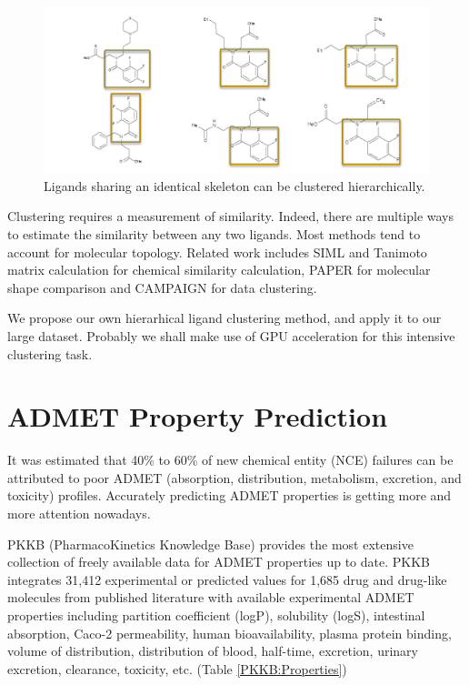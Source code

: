 \begin{figure}
\centering
\includegraphics[width=\textwidth]{istar/LigandClustering.png}
\caption{Ligands sharing an identical skeleton can be clustered hierarchically.}
\label{istar:LigandClustering}
\end{figure}

Clustering requires a measurement of similarity. Indeed, there are multiple ways to estimate the similarity between any two ligands. Most methods tend to account for molecular topology. Related work includes SIML \citep{726} and Tanimoto matrix calculation \citep{881} for chemical similarity calculation, PAPER \citep{491} for molecular shape comparison and CAMPAIGN \citep{932} for data clustering.

We propose our own hierarhical ligand clustering method, and apply it to our large dataset. Probably we shall make use of GPU acceleration for this intensive clustering task.

\section{ADMET Property Prediction}

It was estimated that 40\% to 60\% of new chemical entity (NCE) failures can be attributed to poor ADMET (absorption, distribution, metabolism, excretion, and toxicity) profiles. Accurately predicting ADMET properties is getting more and more attention nowadays.

PKKB (PharmacoKinetics Knowledge Base) \citep{1133} provides the most extensive collection of freely available data for ADMET properties up to date. PKKB integrates 31,412 experimental or predicted values for 1,685 drug and drug-like molecules from published literature with available experimental ADMET properties including partition coefficient (logP), solubility (logS), intestinal absorption, Caco-2 permeability, human bioavailability, plasma protein binding, volume of distribution, distribution of blood, half-time, excretion, urinary excretion, clearance, toxicity, etc. (Table \ref{PKKB:Properties})


